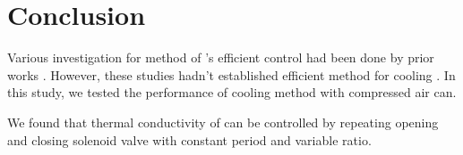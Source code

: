 \section{Conclusion}
Various investigation for method of \scp's efficient control had been done by prior works \cite{haines,mirvakili,yip}. %
However, these studies hadn't established efficient method for cooling \scp. %
In this study, we tested the performance of cooling method with compressed air can. %

We found that thermal conductivity of \scp can be controlled by repeating opening and closing solenoid valve with constant period and variable ratio. %


